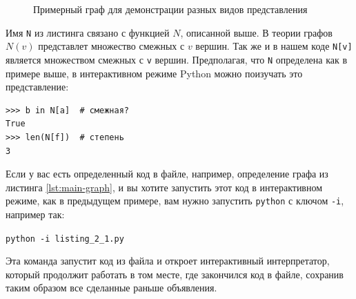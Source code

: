 \begin{figure}[h]
\centering
{}

\caption{Примерный граф для демонстрации разных видов представления}
\label{fig:sample-graph}
\end{figure}

Имя \texttt{N} из листинга связано с функцией $N$, описанной выше. В теории графов $N(v)$ представлет множество смежных с $v$ вершин. Так же и в нашем коде \texttt{N[v]} является множеством смежных с \texttt{v} вершин. Предполагая, что \texttt{N} определена как в примере выше, в интерактивном режиме Python можно поизучать это представление:
\begin{lstlisting}
>>> b in N[a]  # смежная?
True
>>> len(N[f])  # степень
3
\end{lstlisting}


\begin{note}[Совет:]
Если у вас есть определенный код в файле, например, определение графа из листинга \ref{lst:main-graph}, и вы хотите запустить этот код в интерактивном режиме, как в предыдущем примере, вам нужно запустить \texttt{python} с ключом \texttt{-i}, например так:

\texttt{python -i listing\_2\_1.py}

Эта команда запустит код из файла и откроет интерактивный интерпретатор, который продолжит работать в том месте, где закончился код в файле, сохранив таким образом все сделанные раньше объявления.
\end{note}

